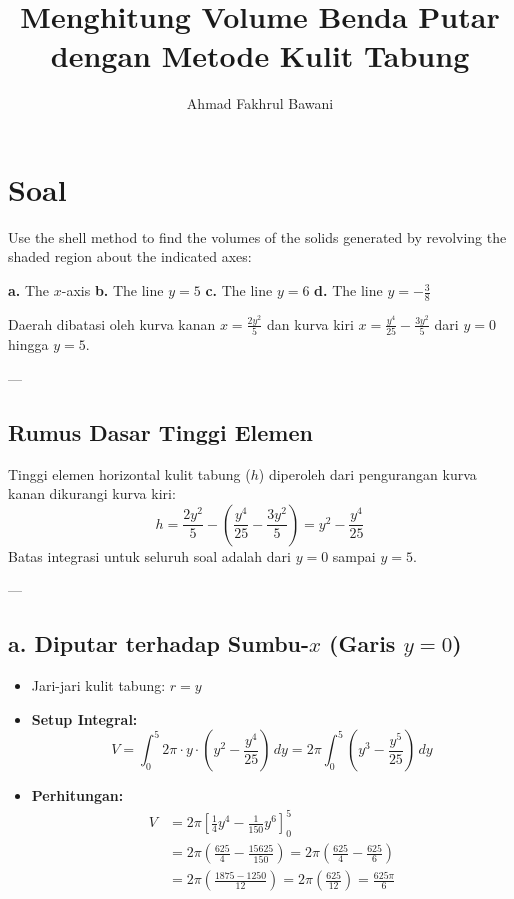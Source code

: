 \documentclass[12pt,a4paper]{article}
\title{Menghitung Volume Benda Putar dengan Metode Kulit Tabung}
\author{Ahmad Fakhrul Bawani}
\date{}
\begin{document}
\maketitle

\section*{Soal}
Use the shell method to find the volumes of the solids generated by revolving the shaded region about the indicated axes:
\begin{center}
  \textbf{a.} The $x$-axis \quad \textbf{b.} The line $y = 5$ \quad \textbf{c.} The line $y = 6$ \quad \textbf{d.} The line $y = -\frac{3}{8}$
\end{center}
Daerah dibatasi oleh kurva kanan $x = \frac{2y^2}{5}$ dan kurva kiri $x = \frac{y^4}{25} - \frac{3y^2}{5}$ dari $y = 0$ hingga $y = 5$.

---

\subsection*{Rumus Dasar Tinggi Elemen}
Tinggi elemen horizontal kulit tabung ($h$) diperoleh dari pengurangan kurva kanan dikurangi kurva kiri:
\begin{equation*}
  h = \frac{2y^2}{5} - \left(\frac{y^4}{25} - \frac{3y^2}{5}\right) = y^2 - \frac{y^4}{25}
\end{equation*}
Batas integrasi untuk seluruh soal adalah dari $y = 0$ sampai $y = 5$.

---

\subsection*{a. Diputar terhadap Sumbu-$x$ (Garis $y = 0$)}
\begin{itemize}
  \item Jari-jari kulit tabung: $r = y$
  \item \textbf{Setup Integral:}
    \begin{equation*}
      V = \int_{0}^{5} 2\pi \cdot y \cdot \left(y^2 - \frac{y^4}{25}\right) \, dy = 2\pi \int_{0}^{5} \left(y^3 - \frac{y^5}{25}\right) \, dy
    \end{equation*}
  \item \textbf{Perhitungan:}
    \begin{align*}
      V &= 2\pi \left[ \frac{1}{4}y^4 - \frac{1}{150}y^6 \right]_{0}^{5} \\
      &= 2\pi \left( \frac{625}{4} - \frac{15625}{150} \right) = 2\pi \left( \frac{625}{4} - \frac{625}{6} \right) \\
      &= 2\pi \left( \frac{1875 - 1250}{12} \right) = 2\pi \left( \frac{625}{12} \right) = \frac{625\pi}{6}
    \end{align*}
\end{itemize}
\end{document}
